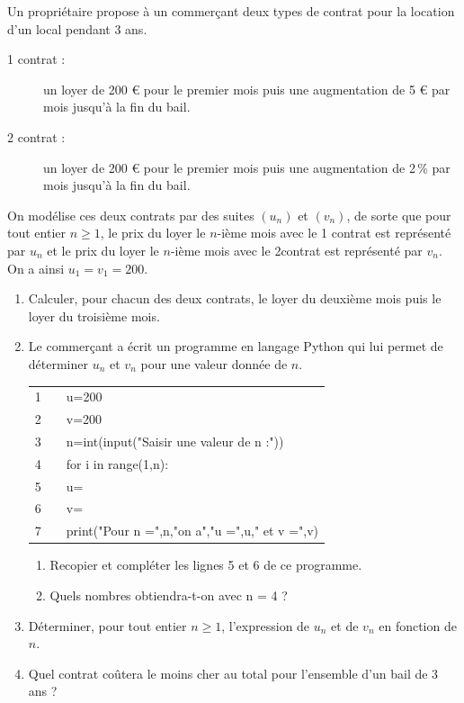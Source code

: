 \medskip

Un propriétaire propose à un commerçant deux types de contrat pour la location d'un local pendant 3 ans.

\begin{description}
\item[1 contrat :]

un loyer de 200 \euro{} pour le premier mois puis une augmentation de 5 \euro{} par mois jusqu'à la fin du bail.

\item [2 contrat :]

 un loyer de 200 \euro{} pour le premier mois puis une augmentation de 2\,\% par mois jusqu'à la fin du bail.
\end{description}
On modélise ces deux contrats par des suites $\left(u_n\right)$ et $\left(v_n\right)$, de sorte que pour tout entier $n\geqslant 1$, le prix du loyer le $n$-ième mois avec le 1 contrat est représenté par $u_n$ et le prix du loyer le $n$-ième mois avec le 2\ieme contrat est représenté par $v_n$.
On a ainsi $u_1=v_1=200$.

\medskip

\begin{enumerate}
\item  Calculer, pour chacun des deux contrats, le loyer du deuxième mois puis le loyer du troisième mois.
\item Le commerçant a écrit un programme en langage Python qui lui permet de déterminer $u_n$ et $v_n$ pour une valeur donnée de $n$.
\begin{center}
\begin{tabular}[]{|ccl|}
\hline
1& & u=200 \\
2& &v=200\\
3& &n=int(input("Saisir une valeur de n :"))\\
4& &for i in range(1,n):\\
5& &\hspace{1.5em}u= \dotfill\\
6& &\hspace{1.5em}v= \dotfill \\
7& &print("Pour n =",n,"on a","u =",u," et v =",v)\\
\hline
\end{tabular}
\end{center}

\begin{enumerate}
\item Recopier et compléter les lignes 5 et 6 de ce programme.
\item Quels nombres obtiendra-t-on avec n = 4 ?
\end{enumerate}
\item Déterminer, pour tout entier $n\geqslant 1$, l'expression de $u_n$ et de $v_n$ en fonction de $n$.
\item Quel contrat coûtera le moins cher au total pour l'ensemble d'un bail de 3 ans ?
\end{enumerate}

\vspace{0,5cm}
